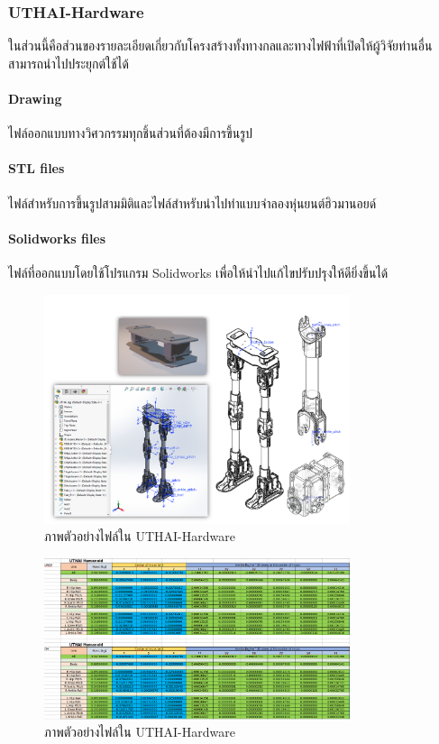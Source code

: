 \clearpage
\subsubsection*{UTHAI-Hardware}
ในส่วนนี้คือส่วนของรายละเอียดเกี่ยวกับโครงสร้างทั้งทางกลและทางไฟฟ้าที่เปิดให้ผู้วิจัยท่านอื่นสามารถนำไปประยุกต์ใช้ได้

\paragraph*{Drawing}
ไฟล์ออกแบบทางวิศวกรรมทุกชิ้นส่วนที่ต้องมีการขึ้นรูป
\paragraph*{STL files}
ไฟล์สำหรับการขึ้นรูปสามมิติและไฟล์สำหรับนำไปทำแบบจำลองหุ่นยนต์ฮิวมานอยด์
\paragraph*{Solidworks files}
ไฟล์ที่ออกแบบโดยใช้โปรแกรม Solidworks เพื่อให้นำไปแก้ไขปรับปรุงให้ดียิ่งขึ้นได้

\begin{figure}[!ht]
	\centering
	\includegraphics[width=0.8\textwidth]{chapter4/images/uthai_platform/uthai_hardware1.png}
	\caption{ภาพตัวอย่างไฟล์ใน UTHAI-Hardware}
\end{figure}
\begin{figure}[!ht]
	\centering
	\includegraphics[width=0.8\textwidth]{chapter4/images/uthai_platform/uthai_properties.png}
	\caption{ภาพตัวอย่างไฟล์ใน UTHAI-Hardware}
\end{figure}


